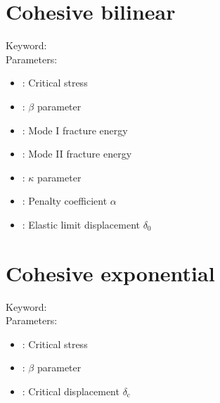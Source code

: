 \section{Cohesive bilinear}

Keyword: \\

\noindent Parameters:
\begin{itemize}
\item {}: Critical stress
\item {}: $\beta$ parameter
\item {}: Mode I fracture energy
\item {}: Mode II fracture energy
\item {}: $\kappa$ parameter
\item {}: Penalty coefficient $\alpha$
\item {}: Elastic limit displacement $\delta_0$
\end{itemize}

\section{Cohesive exponential}

Keyword: \\

\noindent Parameters:
\begin{itemize}
\item {}: Critical stress
\item {}: $\beta$ parameter
\item {}: Critical displacement $\delta_\mathrm{c}$
\end{itemize}
